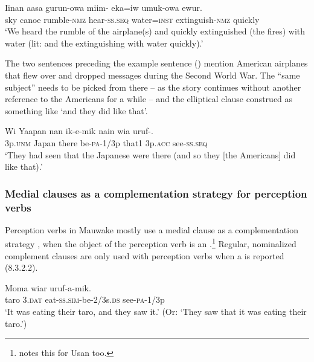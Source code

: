 \ea%
\label{ex:x1498}
\gll Iinan  aasa  gurun-owa  miim-  eka=iw  umuk-owa ewur. \\
sky  canoe  rumble-\textsc{nmz} hear-\textsc{ss}.\textsc{seq} water=\textsc{inst} extinguish-\textsc{nmz} quickly\\
\glt`We heard the rumble of the airplane(s) and quickly extinguished (the fires) with water (lit: and the extinguishing with water quickly).'
\z


The two sentences preceding the example sentence () mention American airplanes that flew over and dropped messages during the Second World War. The ``same subject'' needs to be picked from there -- as the story continues without another reference to the Americans for a while -- and the elliptical clause construed as something like  `and they did like that'.

\ea%
\label{ex:x1499}
\gll Wi  Yaapan  nan  ik-e-mik  nain  wia  uruf-.  \\
3p.\textsc{unm} Japan  there  be-\textsc{pa}-1/3p  that1  3p.\textsc{acc} see-\textsc{ss}.\textsc{seq}\\
\glt`They had seen that the Japanese were there (and so they [the Americans] did like that).'
\z


\subsubsection[Medial clauses as a complementation strategy for perception verbs]{Medial clauses as a complementation strategy for perception verbs}

Perception verbs in Mauwake mostly use a medial clause as a complementation strategy \citep[371]{Dixon2010}, when the object of the perception verb is an .\footnote{\citet[237]{Reesink1983} notes this for Usan too.} Regular, nominalized complement clauses are only used with perception verbs when a  is reported (8.3.2.2).

\ea%
\label{ex:x1509}
\gll Moma  wiar    uruf-a-mik. \\
taro  3.\textsc{dat} eat-\textsc{ss}.\textsc{sim}-be-2/3s.\textsc{ds}  see-\textsc{pa}-1/3p      \\
\glt`It was eating their taro, and they saw it.' (Or: `They saw that it was eating their taro.')
\z


